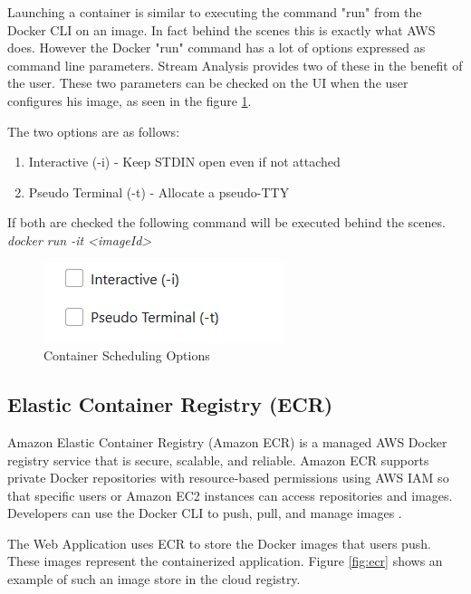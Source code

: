 \newpage

Launching a container is similar to executing the command "run" from the Docker CLI on an image. In fact behind the scenes this is exactly what AWS does. However the Docker "run" command has a lot of options expressed as command line parameters. Stream Analysis provides two of these in the benefit of the user. These two parameters can be checked on the UI when the user configures his image, as seen in the figure \ref{fig:dockerOptions}.

The two options are as follows:

\begin{enumerate}
	\item Interactive (-i) - Keep STDIN open even if not attached
	\item Pseudo Terminal (-t) - Allocate a pseudo-TTY
\end{enumerate}

If both are checked the following command will be executed behind the scenes.\\

\textit{docker run -it <imageId>}\\

\begin{figure}[h]
	\centering
	\includegraphics[width=0.5\linewidth]{./images/webapp/dockerOptions.PNG}
	\caption{Container Scheduling Options}
	\label{fig:dockerOptions}
\end{figure}

\newpage

\subsection{Elastic Container Registry (ECR)}
\label{chap:04:03:02}

Amazon Elastic Container Registry (Amazon ECR) is a managed AWS Docker registry service that is secure, scalable, and reliable. Amazon ECR supports private Docker repositories with resource-based permissions using AWS IAM so that specific users or Amazon EC2 instances can access repositories and images. Developers can use the Docker CLI to push, pull, and manage images \cite{aws-ecr}.

The Web Application uses ECR to store the Docker images that users push. These images represent the containerized application. Figure \ref{fig:ecr} shows an example of such an image store in the cloud registry.

